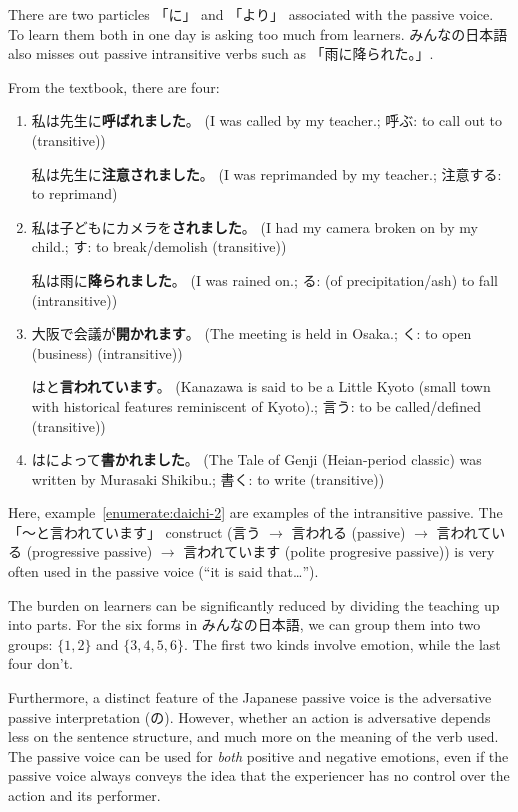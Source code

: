 \documentclass[../nihongo-gakushuu-kyouzai.tex]{subfiles}
\begin{document}
There are two particles 「に」 and 「より」 associated with the passive voice. To learn them both in one day is asking too much from learners. みんなの日本語 also misses out passive intransitive verbs such as 「雨に降られた。」.

From the  textbook, there are four:
\begin{enumerate}[label=\arabic*.]
    \item 私は先生に\textbf{呼ばれました}。 (I was called by my teacher.; 呼ぶ: to call out to (transitive))

    私は先生に\textbf{注意されました}。 (I was reprimanded by my teacher.; 注意する: to reprimand)

    \item \label{enumerate:daichi-2} 私は子どもにカメラを\textbf{されました}。 (I had my camera broken on by my child.; す: to break/demolish (transitive))

    私は雨に\textbf{降られました}。 (I was rained on.; る: (of precipitation/ash) to fall (intransitive))

    \item 大阪で会議が\textbf{開かれます}。 (The meeting is held in Osaka.; く: to open (business) (intransitive))

    はと\textbf{言われています}。 (Kanazawa is said to be a Little Kyoto (small town with historical features reminiscent of Kyoto).; 言う: to be called/defined (transitive))

    \item {}はによって\textbf{書かれました}。 (The Tale of Genji (Heian-period classic) was written by Murasaki Shikibu.; 書く: to write (transitive))
\end{enumerate}
Here, example~\eqref{enumerate:daichi-2} are examples of the intransitive passive. The 「〜と言われています」 construct (言う $\to$ 言われる (passive) $\to$ 言われている (progressive passive) $\to$ 言われています (polite progresive passive)) is very often used in the passive voice (``it is said that\dots'').

The burden on learners can be significantly reduced by dividing the teaching up into parts. For the six forms in みんなの日本語, we can group them into two groups: $\{1,2\}$ and $\{3,4,5,6\}$. The first two kinds involve emotion, while the last four don't.

Furthermore, a distinct feature of the Japanese passive voice is the adversative passive interpretation (の). However, whether an action is adversative depends less on the sentence structure, and much more on the meaning of the verb used.  The passive voice can be used for \emph{both} positive and negative emotions, even if the passive voice always conveys the idea that the experiencer has no control over the action and its performer.
\end{document}
